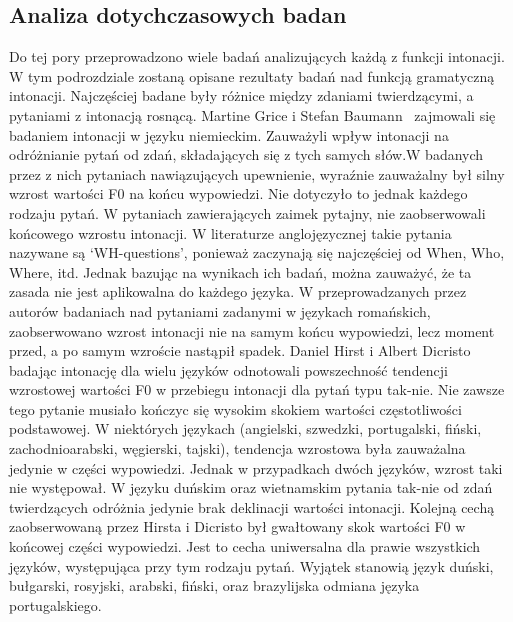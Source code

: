 \documentclass[a4paper,12 pt]{report}
\begin{document}
 

\subsection{Analiza dotychczasowych badan}
Do tej pory przeprowadzono wiele badań analizujących każdą z funkcji intonacji. W tym podrozdziale zostaną opisane rezultaty badań nad funkcją gramatyczną intonacji. Najczęściej badane były różnice między zdaniami twierdzącymi, a pytaniami z intonacją rosnącą.
\leavevmode
\newline
Martine Grice i Stefan Baumann~\cite{GRI-BA} zajmowali się badaniem intonacji w języku niemieckim. Zauważyli wpływ intonacji na odróżnianie pytań od zdań, składających się z tych samych słów.W badanych przez z nich pytaniach nawiązujących upewnienie, wyraźnie zauważalny był silny wzrost wartości F0 na końcu wypowiedzi. Nie dotyczyło to jednak każdego rodzaju pytań. W pytaniach zawierających zaimek pytajny, nie zaobserwowali końcowego wzrostu intonacji. W literaturze anglojęzycznej takie pytania nazywane są `WH-questions', ponieważ zaczynają się najczęściej od When, Who, Where, itd. Jednak bazując na wynikach ich badań, można zauważyć, że ta zasada nie jest aplikowalna do każdego języka. W przeprowadzanych przez autorów badaniach nad pytaniami zadanymi w językach romańskich, zaobserwowano wzrost intonacji nie na samym końcu wypowiedzi, lecz moment przed, a po samym wzroście nastąpił spadek.
\leavevmode
\newline
Daniel Hirst i Albert Dicristo~\cite{INT-SYS} badając intonację dla wielu języków odnotowali powszechność tendencji wzrostowej wartości F0 w przebiegu intonacji dla pytań typu tak-nie. Nie zawsze tego pytanie musiało kończyc się wysokim skokiem wartości częstotliwości podstawowej. W niektórych językach (angielski, szwedzki, portugalski, fiński, zachodnioarabski, węgierski, tajski), tendencja wzrostowa była zauważalna jedynie w części wypowiedzi.
Jednak w przypadkach dwóch języków, wzrost taki nie występował. W języku duńskim oraz wietnamskim pytania tak-nie od zdań twierdzących odróżnia jedynie brak deklinacji wartości intonacji.
\newline Kolejną cechą zaobserwowaną przez Hirsta i Dicristo był gwałtowany skok wartości F0 w końcowej części wypowiedzi. Jest to cecha uniwersalna dla prawie wszystkich języków, występująca przy tym rodzaju pytań. Wyjątek stanowią język duński, bułgarski, rosyjski, arabski, fiński, oraz brazylijska odmiana języka portugalskiego.
\leavevmode
\newline
\end{document}
